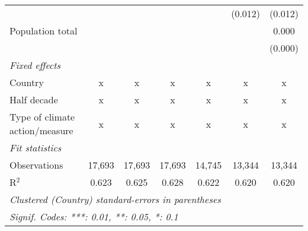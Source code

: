 \begin{tabular}{lcccccc}
                                                                               &               &               &               &                & (0.012)        & (0.012)\\   
   Population total                                                            &               &               &               &                &                & 0.000\\   
                                                                               &               &               &               &                &                & (0.000)\\   
   \emph{Fixed effects}\\
   Country                                                                     & x             & x             & x             & x              & x              & x\\  
   Half decade                                                                 & x             & x             & x             & x              & x              & x\\  
   Type of climate action/measure                                              & x             & x             & x             & x              & x              & x\\  
   \midrule \emph{Fit statistics}\\
   Observations                                                                & 17,693        & 17,693        & 17,693        & 14,745         & 13,344         & 13,344\\  
   R$^2$                                                                       & 0.623         & 0.625         & 0.628         & 0.622          & 0.620          & 0.620\\  
   \midrule
   \multicolumn{7}{l}{\emph{Clustered (Country) standard-errors in parentheses}}\\
   \multicolumn{7}{l}{\emph{Signif. Codes: ***: 0.01, **: 0.05, *: 0.1}}\\
\end{tabular}
\par\endgroup


